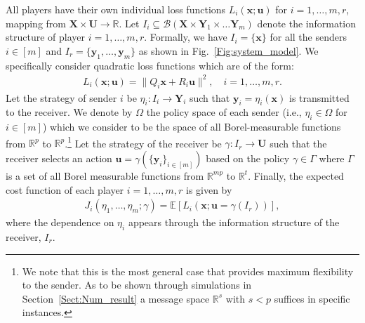 \documentclass[12pt,journal,onecolumn]{IEEEtran}
\begin{document}
 All players have their own individual loss functions $L_i(\boldsymbol{x};\boldsymbol{u})$ for $i=1,\hdots,m,r$, mapping from $\boldsymbol{X}\times\boldsymbol{U}\rightarrow\mathbb{R}$. Let $I_i\subseteq \mathcal{B}(\boldsymbol{X}\times \boldsymbol{Y}_1\times\hdots\boldsymbol{Y}_m)$ denote the information structure of player $i=1,\hdots,m,r$.  Formally, we have $I_i=\{\boldsymbol{x}\}$ for all the senders $i\in[m]$ and $I_r=\{\boldsymbol{y}_1,\hdots,\boldsymbol{y}_m\}$ as shown in Fig.~\ref{Fig:system_model}. We specifically consider quadratic loss functions which are of the form:
\begin{align}\label{eqn:loss_fnc}
L_i(\boldsymbol{x};\boldsymbol{u})=\|Q_i\boldsymbol{x}+R_i\boldsymbol{u}\|^2,\quad i=1,\hdots,m,r.
\end{align}
Let the strategy of sender $i$ be $\eta_i:I_i\rightarrow \boldsymbol{Y}_i$ such that $\boldsymbol{y}_i=\eta_i(\boldsymbol{x})$ is transmitted to the receiver. We denote by $\Omega$ the policy space of each sender (i.e., $\eta_i\in\Omega$ for $i\in[m]$) which we consider to be the space of all Borel-measurable functions from $\mathbb{R}^p$ to $\mathbb{R}^p$.\footnote{We note that this is the most general case that provides maximum flexibility to the sender. As to be shown through simulations in Section~\ref{Sect:Num_result} a message space $\mathbb{R}^s$ with $s<p$ suffices in specific instances.} Let the strategy of the receiver be $\gamma:I_r\rightarrow \boldsymbol{U}$ such that the receiver selects an action $\mathbf{u}=\gamma(\{\boldsymbol{y}_i\}_{i\in[m]})$ based on the policy $\gamma\in\Gamma$ where $\Gamma$ is a set of all Borel measurable functions from $\mathbb{R}^{mp}$ to $\mathbb{R}^t$. Finally, the expected cost function of each player $i=1,\hdots,m,r$ is given by
\begin{align}  J_i(\eta_1,\hdots,\eta_m;\gamma)=\mathbb{E}[L_i(\boldsymbol{x};\boldsymbol{u}=\gamma(I_r))],
\end{align}
where the dependence on $\eta_i$ appears through the information structure of the receiver, $I_r$.
\end{document}

